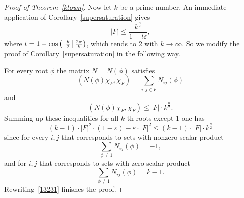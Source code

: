 \documentclass[8pt]{article}
\begin{document}
\begin{proof}[Proof of Theorem~\ref{ktown}]
Now let $k$ be a prime number. An immediate application of Corollary~\ref{supersaturation} gives
\[
|F| \leq \frac{k^{\frac{n}{2}}} {1 - t \varepsilon},
\]
where $t = 1 - \cos \left ( \left\lfloor \frac{k}{2} \right\rfloor \frac{2 \pi}{k} \right )$, which tends to 2 with $k \to \infty$.
So we modify the proof of Corollary~\ref{supersaturation} in the following way.

For every root $\phi$ the matrix $N = N(\phi)$ satisfies
\[
(N(\phi) \chi_F, \chi_F) = \sum_{i,j \in F} N_{ij}(\phi) 
\]
and
\[
(N(\phi) \chi_F, \chi_F) \leq |F| \cdot k^{\frac{n}{2}}.
\]
Summing up these inequalities for all $k$-th roots except $1$ one has
\begin{equation}
 (k-1) \cdot |F|^2 \cdot (1-\varepsilon) - \varepsilon \cdot |F|^2  \leq (k-1) \cdot |F| \cdot k^{\frac{n}{2}}
\label{13231}    
\end{equation}
since for every $i,j$ that corresponds to sets with nonzero scalar product
\[
\sum_{\phi \neq 1} N_{ij}(\phi) = -1,
\]
and for $i,j$ that corresponds to sets with zero scalar product
\[
\sum_{\phi \neq 1} N_{ij}(\phi) = k-1.
\]
Rewriting~\eqref{13231} finishes the proof.
\end{proof}
\end{document}
